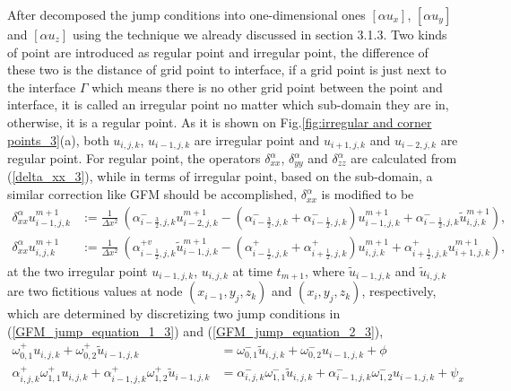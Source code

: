 \documentclass[dissertation]{uathesis}
\begin{document}
\begin{body}
After decomposed the jump conditions into one-dimensional ones $[\alpha u_x]$, $[\alpha u_y]$ and $[\alpha u_z]$ using the technique we already discussed in section 3.1.3. Two kinds of point are introduced as regular point and irregular point, the difference of these two is the distance of grid point to interface, if a grid point is just next to the interface $\Gamma$ which means there is no other grid point between the point and interface, it is called an irregular point no matter which sub-domain they are in, otherwise, it is a regular point. As it is shown on Fig.\ref{fig:irregular and corner points_3}(a), both $u_{i,j,k}$, $u_{i-1,j,k}$ are irregular point and $u_{i+1,j,k}$ and $u_{i-2,j,k}$ are regular point. For regular point, the operators $\delta_{xx}^{\alpha}$, $\delta_{yy}^{\alpha}$ and $\delta_{zz}^{\alpha}$ are calculated from (\ref{delta_xx_3}), while in terms of irregular point, based on the sub-domain, a similar correction like GFM should be accomplished, 
$\delta_{xx}^{\alpha}$ is modified to be 
%
\begin{align}
\label{reformed_delta_xx_1}
\delta_{xx}^{\alpha} u^{m+1}_{i-1,j,k} &:=  
\frac{1}{\Delta x^{2}} ~ (\alpha^{-}_{i-\frac{3}{2},j,k} u^{m+1}_{i-2,j,k} - (\alpha^{-}_{i-\frac{3}{2},j,k} + \alpha^{-}_{i-\frac{1}{2},j,k}) u^{m+1}_{i-1,j,k} + \alpha^{-}_{i-\frac{1}{2},j,k} \tilde{u}^{m+1}_{i,j,k}), \\
\label{reformed_delta_xx_2}
\delta_{xx}^{\alpha} u^{m+1}_{i,j,k} &:=  
\frac{1}{\Delta x^{2}} ~ (\alpha^{+v}_{i-\frac{1}{2},j,k} \tilde{u}^{m+1}_{i-1,j,k} - (\alpha^{+}_{i-\frac{1}{2},j,k} + \alpha^{+}_{i+\frac{1}{2},j,k}) u^{m+1}_{i,j,k} + \alpha^{+}_{i+\frac{1}{2},j,k} u^{m+1}_{i+1,j,k}),
\end{align}
%
at the two irregular point $u_{i-1,j,k}$, $u_{i,j,k}$ at time $t_{m+1}$, where $\tilde u_{i-1,j,k}$ and $\tilde u_{i,j,k}$ are two fictitious values at node $(x_{i-1},y_j,z_k)$ and $(x_i,y_j,z_k)$, respectively, which are determined by discretizing two jump conditions in (\ref{GFM_jump_equation_1_3}) and (\ref{GFM_jump_equation_2_3}),
%
\begin{align}
\label{MIB_V1_jump_1_3}
\omega^{+}_{0,1}u_{i,j,k} + \omega^{+}_{0,2} \tilde{u}_{i-1,j,k} &=
\omega^{-}_{0,1} \tilde{u}_{i,j,k} + \omega^{-}_{0,2}u_{i-1,j,k} + \phi \\
\label{MIB_V2_jump_2_3} 
\alpha^{+}_{i,j,k}\omega^{+}_{1,1}u_{i,j,k}+\alpha^{+}_{i-1,j,k}\omega^{+}_{1,2}\tilde{u}_{i-1,j,k} &= 
\alpha^{-}_{i,j,k}\omega^{-}_{1,1}\tilde{u}_{i,j,k} + \alpha^{-}_{i-1,j,k}\omega^{-}_{1,2}u_{i-1,j,k} + \psi_{x}

\end{align}
\end{body}
\end{document}
